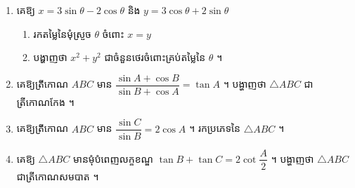 \begin{enumerate}[1]
\begin{tasks}
    \task $3\cos y + \cot y = 0$
    \task $2\sin 2x + 1 = 0$
    \task $6\sin x - 8\sin^2 x = 5\cos^2 x$
    \task $2\cot 2x = 5$
    \task $3\sin y\tan y + 8 = 0$
    \task $3\cos^2 y = 7\sin y + 5$
    \task $\cot\left(\dfrac{z}{2}\right) - 2\cos\left(\dfrac{z}{2}\right) = 0$
    \task $\tan(x - 30^\circ)\tan 50^\circ = 0$ ។
  \end{tasks}
  \item គេឱ្យ $x = 3\sin\theta - 2\cos\theta$ និង $y = 3\cos\theta + 2\sin\theta$
  \begin{enumerate}[a]
    \item រកតម្លៃនៃមុំស្រួច $\theta$ ចំពោះ $x = y$
    \item បង្ហាញថា $x^2 + y^2$ ជាចំនួនថេរចំពោះគ្រប់តម្លៃនៃ $\theta$ ។
  \end{enumerate}
  \item គេឱ្យត្រីកោណ $ABC$ មាន $\dfrac{\sin A + \cos B}{\sin B + \cos A} = \tan A$ ។ បង្ហាញថា $\triangle ABC$ ជាត្រីកោណកែង ។
  \item គេឱ្យត្រីកោណ $ABC$ មាន $\dfrac{\sin C}{\sin B} = 2\cos A$ ។ រកប្រភេទនៃ $\triangle ABC$ ។
  \item គេឱ្យ $\triangle ABC$ មានមុំបំពេញលក្ខខណ្ឌ $\tan B + \tan C = 2\cot\dfrac{A}{2}$ ។ បង្ហាញថា $\triangle ABC$ ជាត្រីកោណសមបាត ។
\end{enumerate}
